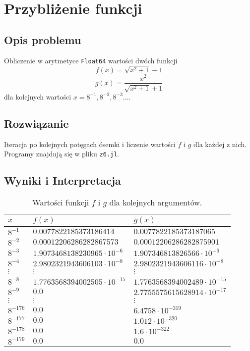 \documentclass[a4paper]{article}
\begin{document}
\section{Przybliżenie funkcji}
    \subsection{Opis problemu}
    Obliczenie w arytmetyce \texttt{Float64} wartości dwóch funkcji \[f(x)=\sqrt{x^2 + 1} - 1\] \[g(x)=\frac{x^2}{\sqrt{x^2+1}+1}\] dla kolejnych wartości $x=8^{-1}, 8^{-2}, 8^{-3}\dots$.
    
    \subsection{Rozwiązanie}
    Iteracja po kolejnych potęgach ósemki i liczenie wartości $f$ i $g$ dla każdej z nich.
    Programy znajdują się w pliku \texttt{z6.jl}.
    
    \subsection{Wyniki i Interpretacja}
   
    \begin{table}[!h]
    \centering
    \begin{tabular}{|l | l | l|}
    \hline
    $x$ & $f(x)$ & $g(x)$ \\ \hline
    $8^{-1}$ & $0.0077822185373186414$ & $0.0077822185373187065$ \\
    $8^{-2}$ & $0.00012206286282867573$ & $0.00012206286282875901$ \\
    $8^{-3}$ & $1.9073468138230965\cdot 10^{-6}$ & $1.907346813826566\cdot 10^{-6}$ \\
    $8^{-4}$ & $2.9802321943606103\cdot 10^{-8}$ & $2.9802321943606116\cdot 10^{-8}$ \\
    $\vdots$ & $\vdots$ & $\vdots$ \\
    $8^{-8}$ & $1.7763568394002505\cdot 10^{-15}$ & $1.7763568394002489\cdot 10^{-15}$ \\
    $8^{-9}$ & $0.0$ & $2.7755575615628914\cdot 10^{-17}$ \\
    $\vdots$ & $\vdots$ & $\vdots$ \\
    $8^{-176}$ & $0.0$ & $6.4758\cdot 10^{-319}$ \\
    $8^{-177}$ & $0.0$ & $1.012\cdot 10^{-320}$ \\
    $8^{-178}$ & $0.0$ & $1.6\cdot 10^{-322}$ \\
    $8^{-179}$ & $0.0$ & $0.0$ \\
    \hline
    \end{tabular}
    \caption{\label{table:7}Wartości funkcji $f$ i $g$ dla kolejnych argumentów.}
    \end{table}
    
\end{document}
